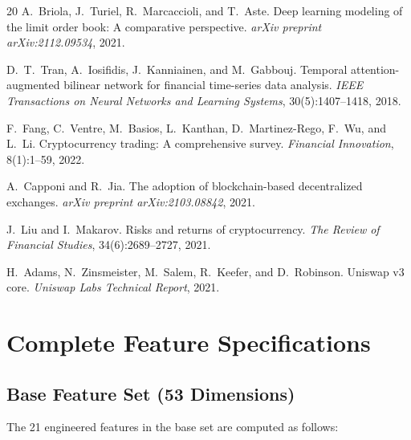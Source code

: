\documentclass[11pt,a4paper]{article}
\begin{document}
\begin{thebibliography}{20}
A.~Briola, J.~Turiel, R.~Marcaccioli, and T.~Aste.
\newblock Deep learning modeling of the limit order book: A comparative perspective.
\newblock \emph{arXiv preprint arXiv:2112.09534}, 2021.

D.~T.~Tran, A.~Iosifidis, J.~Kanniainen, and M.~Gabbouj.
\newblock Temporal attention-augmented bilinear network for financial time-series data analysis.
\newblock \emph{IEEE Transactions on Neural Networks and Learning Systems}, 30(5):1407--1418, 2018.

F.~Fang, C.~Ventre, M.~Basios, L.~Kanthan, D.~Martinez-Rego, F.~Wu, and L.~Li.
\newblock Cryptocurrency trading: A comprehensive survey.
\newblock \emph{Financial Innovation}, 8(1):1--59, 2022.

A.~Capponi and R.~Jia.
\newblock The adoption of blockchain-based decentralized exchanges.
\newblock \emph{arXiv preprint arXiv:2103.08842}, 2021.

J.~Liu and I.~Makarov.
\newblock Risks and returns of cryptocurrency.
\newblock \emph{The Review of Financial Studies}, 34(6):2689--2727, 2021.

H.~Adams, N.~Zinsmeister, M.~Salem, R.~Keefer, and D.~Robinson.
\newblock Uniswap v3 core.
\newblock \emph{Uniswap Labs Technical Report}, 2021.

\end{thebibliography}


\appendix
\section{Complete Feature Specifications}
\label{app:features}

\subsection{Base Feature Set (53 Dimensions)}

The 21 engineered features in the base set are computed as follows:
\end{document}
